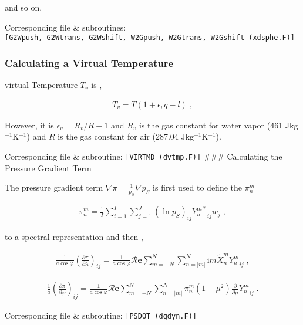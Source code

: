 and so on.

Corresponding file \& subroutines:
\texttt{{[}G2Wpush,\ G2Wtrans,\ G2Wshift,\ W2Gpush,\ W2Gtrans,\ W2Gshift\ (xdsphe.F){]}}

\hypertarget{calculating-a-virtual-temperature}{%
\subsubsection{Calculating a Virtual
Temperature}\label{calculating-a-virtual-temperature}}

virtual Temperature \(T_v\) is ,

\begin{eqnarray}
  T_v = T ( 1 + \epsilon_v q - l ) \; ,
\end{eqnarray}

However, it is \(\epsilon_v = R_v/R - 1\) and \(R_v\) is the gas
constant for water vapor (461 Jkg\(^{-1}\)K\(^{-1}\)) and \(R\) is the
gas constant for air (287.04 Jkg\(^{-1}\)K\(^{-1}\)).

Corresponding file \& subroutine: \texttt{{[}VIRTMD\ (dvtmp.F){]}}
\#\#\# Calculating the Pressure Gradient Term

The pressure gradient term \(\nabla \pi = \frac{1}{p_S} \nabla p_S\) is
first used to define the \(\pi_n^m\)

\begin{eqnarray}
  \pi_n^m  =  \frac{1}{I} \sum_{i=1}^{I} \sum_{j=1}^{J}  
               (\ln {p_S})_{ij} {Y_n^{m *}}_{ij}  w_j \; ,
\end{eqnarray}

to a spectral representation and then ,

\begin{eqnarray}
   \frac{1}{a \cos \varphi}
   \left( \frac{\partial \pi}{\partial \lambda} \right)_{ij}
     =
   \frac{1}{a \cos \varphi}
        {\mathcal R}{\mathbf{e}} \sum_{m=-N}^{N} \sum_{n=|m|}^{N}
       \mathrm{i}m \tilde{X}_n^m {Y_n^m}_{ij}  \; ,
\end{eqnarray}

\begin{eqnarray}
   \frac{1}{a}
   \left( \frac{\partial \pi}{\partial \varphi} \right)_{ij}
     =  
   \frac{1}{a \cos \varphi}
       {\mathcal R}{\mathbf{e}} \sum_{m=-N}^{N} \sum_{n=|m|}^{N}
       \pi_n^m
       ( 1-\mu^{2} ) \frac{\partial }{\partial \mu} {Y_n^m}_{ij}  \; .
\end{eqnarray}

Corresponding file \& subroutine: \texttt{{[}PSDOT\ (dgdyn.F){]}}

